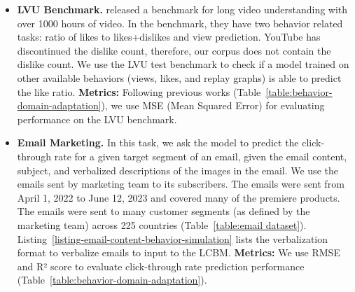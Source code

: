 \begin{enumerate}[leftmargin=*]
    \begin{itemize}
        \item\textbf{LVU Benchmark.} \citet{wu2021towards} released a benchmark for long video understanding with over 1000 hours of video. In the benchmark, they have two behavior related tasks: ratio of likes to likes+dislikes and view prediction. YouTube has discontinued the dislike count, therefore, our corpus does not contain the dislike count. We use the LVU test benchmark to check if a model trained on other available behaviors (views, likes, and replay graphs) is able to predict the like ratio. \textbf{Metrics:} Following previous works \cite{bhattacharya2023video} (Table~\ref{table:behavior-domain-adaptation}), we use MSE (Mean Squared Error) for evaluating performance on the LVU benchmark.
        
        \item\textbf{\companyName Email Marketing.} In this task, we ask the model to predict the click-through rate for a given target segment of an email, given the email content, subject, and verbalized descriptions of the images in the email. We use the emails sent by \companyName marketing team to its subscribers. The emails were sent from April 1, 2022 to June 12, 2023 and covered many of the premiere products. The emails were sent to many customer segments (as defined by the marketing team) across 225 countries (Table~\ref{table:email dataset}). Listing~\ref{listing-email-content-behavior-simulation} lists the verbalization format to verbalize emails to input to the LCBM. \textbf{Metrics:} We use RMSE and R² score to evaluate click-through rate prediction performance (Table~\ref{table:behavior-domain-adaptation}).
    \end{itemize}
\end{enumerate}




